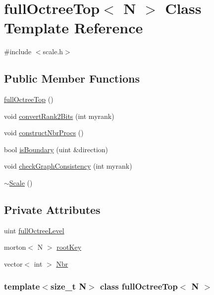 \hypertarget{classfullOctreeTop}{
\section{fullOctreeTop$<$ N $>$ Class Template Reference}
\label{classfullOctreeTop}
}


{\ttfamily \#include $<$scale.h$>$}\subsection*{Public Member Functions}
\begin{DoxyCompactItemize}
\item 
\hyperlink{classfullOctreeTop_a12f92276ec4139dcd1ca8be5f54f2c7d}{fullOctreeTop} ()
\item 
void \hyperlink{classfullOctreeTop_a2ac642778cc0a360e4077ace0498530c}{convertRank2Bits} (int myrank)
\item 
void \hyperlink{classfullOctreeTop_a03cfaef9b474524b82dec9c77e07ef96}{constructNbrProcs} ()
\item 
bool \hyperlink{classfullOctreeTop_ac6953cc241ee8e048b4fc4867f9a21f1}{isBoundary} (uint \&direction)
\item 
void \hyperlink{classfullOctreeTop_a1e5fd8556f13e91699381f589eb1e372}{checkGraphConsistency} (int myrank)
\item 
\hyperlink{classfullOctreeTop_a3e4c45e27e7a9e571fb27af03075fc70}{$\sim$Scale} ()
\end{DoxyCompactItemize}
\subsection*{Private Attributes}
\begin{DoxyCompactItemize}
\item 
uint \hyperlink{classfullOctreeTop_a15287409a42ab0318bea9c8312d7736f}{fullOctreeLevel}
\item 
morton$<$ N $>$ \hyperlink{classfullOctreeTop_a77b39b1cd91efb3fbbb1f99fe59567d1}{rootKey}
\item 
vector$<$ int $>$ \hyperlink{classfullOctreeTop_a2a6819a1dafdbb62deed31d3365603b5}{Nbr}
\end{DoxyCompactItemize}
\subsubsection*{template$<$size\_\-t N$>$ class fullOctreeTop$<$ N $>$}



